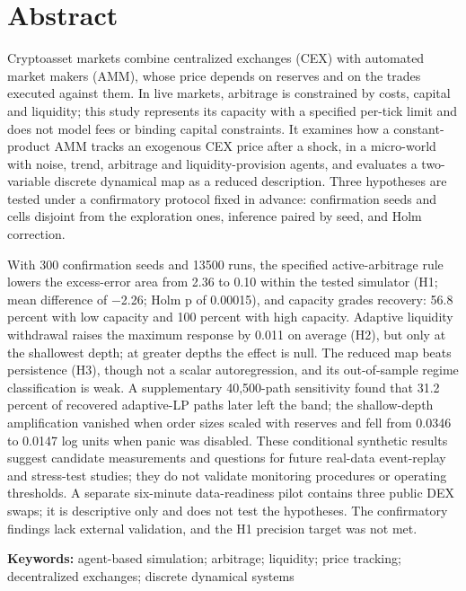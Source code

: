 \section{Abstract}

Cryptoasset markets combine centralized exchanges (CEX) with automated market makers (AMM), whose price depends on reserves and on the trades executed against them. In live markets, arbitrage is constrained by costs, capital and liquidity; this study represents its capacity with a specified per-tick limit and does not model fees or binding capital constraints. It examines how a constant-product AMM tracks an exogenous CEX price after a shock, in a micro-world with noise, trend, arbitrage and liquidity-provision agents, and evaluates a two-variable discrete dynamical map as a reduced description. Three hypotheses are tested under a confirmatory protocol fixed in advance: confirmation seeds and cells disjoint from the exploration ones, inference paired by seed, and Holm correction.

With 300 confirmation seeds and 13500 runs, the specified active-arbitrage rule lowers the excess-error area from 2.36 to 0.10 within the tested simulator (H1; mean difference of −2.26; Holm p of 0.00015), and capacity grades recovery: 56.8 percent with low capacity and 100 percent with high capacity. Adaptive liquidity withdrawal raises the maximum response by 0.011 on average (H2), but only at the shallowest depth; at greater depths the effect is null. The reduced map beats persistence (H3), though not a scalar autoregression, and its out-of-sample regime classification is weak. A supplementary 40,500-path sensitivity found that 31.2 percent of recovered adaptive-LP paths later left the band; the shallow-depth amplification vanished when order sizes scaled with reserves and fell from 0.0346 to 0.0147 log units when panic was disabled. These conditional synthetic results suggest candidate measurements and questions for future real-data event-replay and stress-test studies; they do not validate monitoring procedures or operating thresholds. A separate six-minute data-readiness pilot contains three public DEX swaps; it is descriptive only and does not test the hypotheses. The confirmatory findings lack external validation, and the H1 precision target was not met.

\textbf{Keywords:} agent-based simulation; arbitrage; liquidity; price tracking; decentralized exchanges; discrete dynamical systems
